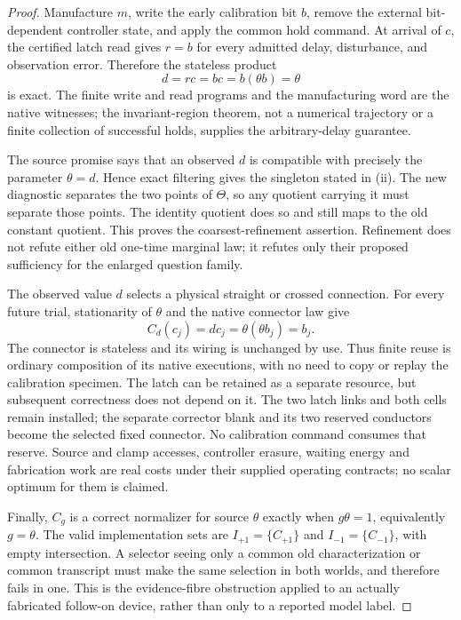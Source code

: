 \documentclass[11pt]{article}
\theoremstyle{definition}
\theoremstyle{remark}
\begin{document}
\begin{proof}
Manufacture $m$, write the early calibration bit $b$, remove the external
bit-dependent controller state, and apply the common hold command. At
arrival of $c$, the certified latch read gives $r=b$ for every admitted
delay, disturbance, and observation error. Therefore the stateless product
\[
                         d=rc=bc=b(\theta b)=\theta
\]
is exact. The finite write and read programs and the manufacturing word
are the native witnesses; the invariant-region theorem, not a numerical
trajectory or a finite collection of successful holds, supplies the
arbitrary-delay guarantee.

The source promise says that an observed $d$ is compatible with precisely
the parameter $\theta=d$. Hence exact filtering gives the singleton stated
in (ii). The new diagnostic separates the two points of $\Theta$, so any
quotient carrying it must separate those points. The identity quotient
does so and still maps to the old constant quotient. This proves the
coarsest-refinement assertion. Refinement does not refute either old
one-time marginal law; it refutes only their proposed sufficiency for the
enlarged question family.

The observed value $d$ selects a physical straight or crossed connection.
For every future trial, stationarity of $\theta$ and the native connector
law give
\[
                C_d(c_j)=d c_j=\theta(\theta b_j)=b_j.
\]
The connector is stateless and its wiring is unchanged by use. Thus finite
reuse is ordinary composition of its native executions, with no need to
copy or replay the calibration specimen. The latch can be retained as a
separate resource, but subsequent correctness does not depend on it. The two latch
links and both cells remain installed; the separate corrector blank and
its two reserved conductors become the selected fixed connector. No
calibration command consumes that reserve. Source and clamp accesses,
controller erasure, waiting energy and fabrication work are real costs
under their supplied operating contracts; no scalar optimum for them is
claimed.

Finally, $C_g$ is a correct normalizer for source $\theta$ exactly when
$g\theta=1$, equivalently $g=\theta$. The valid implementation sets are
$I_{+1}=\{C_{+1}\}$ and $I_{-1}=\{C_{-1}\}$, with empty intersection.
A selector seeing only a common old characterization or common transcript
must make the same selection in both worlds, and therefore fails in one.
This is the evidence-fibre obstruction applied to an actually fabricated
follow-on device, rather than only to a reported model label.
\end{proof}
\end{document}
